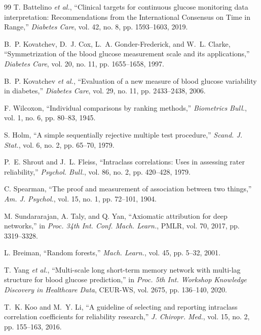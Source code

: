 \documentclass[journal]{IEEEtran}
\begin{document}
\begin{thebibliography}{99}
\label{ref52label} T. Battelino \emph{et al.}, ``Clinical targets for continuous glucose monitoring data interpretation: Recommendations from the International Consensus on Time in Range,'' \emph{Diabetes Care}, vol. 42, no. 8, pp. 1593--1603, 2019.

\label{ref46label} B.~P. Kovatchev, D.~J. Cox, L.~A. Gonder-Frederick, and W.~L. Clarke, ``Symmetrization of the blood glucose measurement scale and its applications,'' \emph{Diabetes Care}, vol. 20, no. 11, pp. 1655--1658, 1997.

\label{ref47label} B.~P. Kovatchev \emph{et al.}, ``Evaluation of a new measure of blood glucose variability in diabetes,'' \emph{Diabetes Care}, vol. 29, no. 11, pp. 2433--2438, 2006.

\label{ref48label} F. Wilcoxon, ``Individual comparisons by ranking methods,'' \emph{Biometrics Bull.}, vol. 1, no. 6, pp. 80--83, 1945.

\label{ref49label} S. Holm, ``A simple sequentially rejective multiple test procedure,'' \emph{Scand. J. Stat.}, vol. 6, no. 2, pp. 65--70, 1979.

\label{ref50label} P.~E. Shrout and J.~L. Fleiss, ``Intraclass correlations: Uses in assessing rater reliability,'' \emph{Psychol. Bull.}, vol. 86, no. 2, pp. 420--428, 1979.

\label{ref51label} C. Spearman, ``The proof and measurement of association between two things,'' \emph{Am. J. Psychol.}, vol. 15, no. 1, pp. 72--101, 1904.

\label{ref54label} M. Sundararajan, A. Taly, and Q. Yan, ``Axiomatic attribution for deep networks,'' in \emph{Proc. 34th Int. Conf. Mach. Learn.}, PMLR, vol. 70, 2017, pp. 3319--3328.

\label{ref55label} L. Breiman, ``Random forests,'' \emph{Mach. Learn.}, vol. 45, pp. 5--32, 2001.

\label{ref64label} T. Yang \emph{et al.}, ``Multi-scale long short-term memory network with multi-lag structure for blood glucose prediction,'' in \emph{Proc. 5th Int. Workshop Knowledge Discovery in Healthcare Data}, CEUR-WS, vol. 2675, pp. 136--140, 2020.

\label{ref76label} T.~K. Koo and M.~Y. Li, ``A guideline of selecting and reporting intraclass correlation coefficients for reliability research,'' \emph{J. Chiropr. Med.}, vol. 15, no. 2, pp. 155--163, 2016.


\end{thebibliography}
\end{document}

